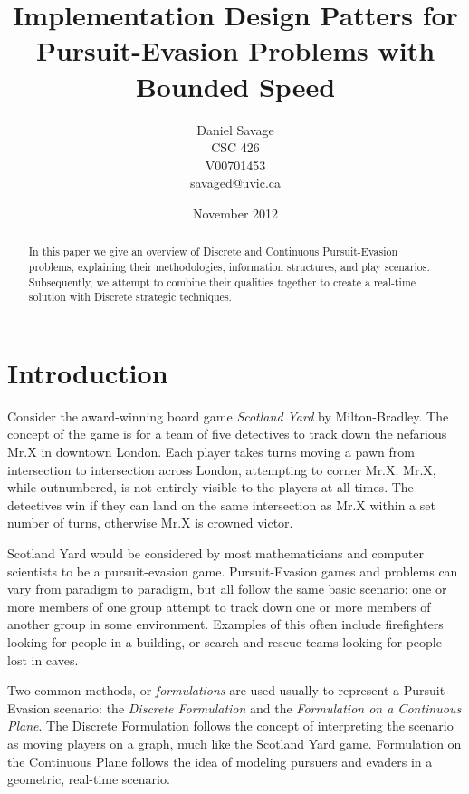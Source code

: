 \documentclass{article}
\begin{document}
\title{Implementation Design Patters for Pursuit-Evasion Problems with Bounded Speed}
\author{Daniel Savage\\CSC 426\\{V00701453}\\savaged@uvic.ca}
\date{November 2012}
\maketitle
\pagebreak

\begin{abstract}
In this paper we give an overview of Discrete and Continuous Pursuit-Evasion problems, explaining their methodologies, information structures, and play scenarios. Subsequently, we attempt to combine their qualities together to create a real-time solution with Discrete strategic techniques.
\end{abstract}

\section{Introduction}
Consider the award-winning board game \emph{Scotland Yard} by Milton-Bradley. The concept of the game is for a team of five detectives to track down the nefarious Mr.X in downtown London. Each player takes turns moving a pawn from intersection to intersection across London, attempting to corner Mr.X. Mr.X, while outnumbered, is not entirely visible to the players at all times. The detectives win if they can land on the same intersection as Mr.X within a set number of turns, otherwise Mr.X is crowned victor.

Scotland Yard would be considered by most mathematicians and computer scientists to be a pursuit-evasion game. Pursuit-Evasion games and problems can vary from paradigm to paradigm, but all follow the same basic scenario: one or more members of one group attempt to track down one or more members of another group in some environment. Examples of this often include firefighters looking for people in a building, or search-and-rescue teams looking for people lost in caves. \cite{parsons, robotics}

Two common methods, or \emph{formulations} are used usually to represent a Pursuit-Evasion scenario: the \emph{Discrete Formulation} and the \emph{Formulation on a Continuous Plane}. The Discrete Formulation follows the concept of interpreting the scenario as moving players on a graph, much like the Scotland Yard game. Formulation on the Continuous Plane follows the idea of modeling pursuers and evaders in a geometric, real-time scenario.
\end{document}
